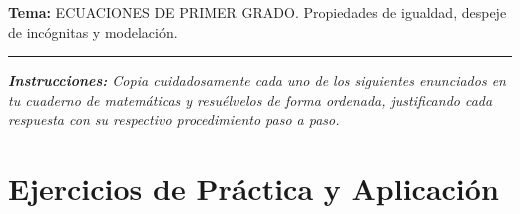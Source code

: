 \documentclass[12pt, letterpaper]{article}
\begin{document}
	\vspace{0.2cm}
	\noindent \textbf{Tema:} ECUACIONES DE PRIMER GRADO. Propiedades de igualdad, despeje de incógnitas y modelación.
	\vspace{0.2cm}
	\hrule
	\vspace{0.4cm}
	
	\noindent \textit{\textbf{Instrucciones:} Copia cuidadosamente cada uno de los siguientes enunciados en tu cuaderno de matemáticas y resuélvelos de forma ordenada, justificando cada respuesta con su respectivo procedimiento paso a paso.}
	\vspace{0.6cm}
	
	\section*{Ejercicios de Práctica y Aplicación}
	
\end{document}
